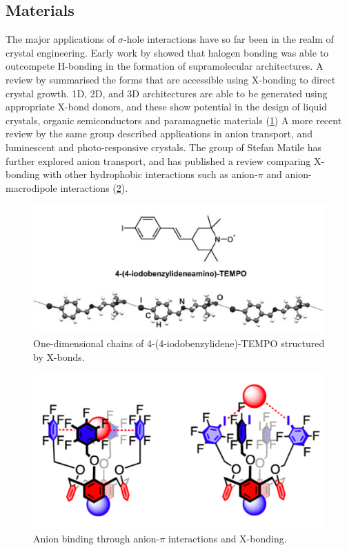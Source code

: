 \begin{refsection}
\subsection{Materials}
The major applications of $ \sigma $-hole interactions have so far been in the realm of crystal engineering.
Early work by \citeauthor{Corradi2000} showed that halogen bonding was able to outcompete H-bonding in the formation of supramolecular architectures.\autocite{Corradi2000}
A review by \citeauthor{Metrangolo2008} summarised the forms that are accessible using X-bonding to direct crystal growth.\autocite{Metrangolo2008}
1D, 2D, and 3D architectures are able to be generated using appropriate X-bond donors, and these show potential in the design of liquid crystals, organic semiconductors and paramagnetic materials (\cref{fig:iodotempo-chains})
A more recent review by the same group described applications in anion transport, and luminescent and photo-responsive crystals.\autocite{Priimagi2013}
The group of Stefan Matile has further explored anion transport, and has published a review comparing X-bonding with other hydrophobic interactions such as anion-$ \pi $ and anion-macrodipole interactions (\cref{fig:matile-anion-binder}).\autocite{VargasJentzsch2013}

\begin{figure}
    \centering
    \includegraphics[width=0.6\linewidth]{Figures/iodotempo-chains.pdf}
    \caption{One-dimensional chains of 4-(4-iodobenzylidene)-TEMPO structured by X-bonds.\autocite{Metrangolo2008}}\label{fig:iodotempo-chains}
\end{figure}

\begin{figure}
    \centering
    \includegraphics[width=0.4\linewidth]{Figures/matile-anion-binder.pdf}
    \caption{Anion binding through anion-$ \pi $ interactions and X-bonding.\autocite{VargasJentzsch2013}}\label{fig:matile-anion-binder}
\end{figure}


\end{refsection}
